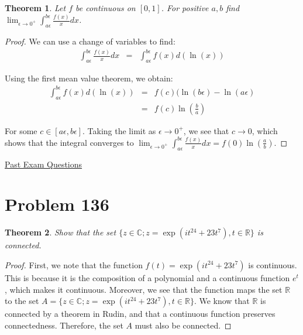 \documentclass[psamsfonts]{amsart}
\newtheorem{thm}{Theorem}[section]
\theoremstyle{definition}
\theoremstyle{remark}
\numberwithin{equation}{section}
\begin{document}
\begin{thm}
Let $f$ be continuous on $[0,1]$. For positive $a,b$ find $\lim_{\epsilon \to 0^{+}} \int_{a \epsilon}^{ b \epsilon} \frac{f(x)}{x} dx$. 
\end{thm}

\begin{proof}
We can use a change of variables to find:
\begin{eqnarray}
\int_{a \epsilon}^{b \epsilon} \frac{f(x)}{x} dx &=& \int_{a \epsilon}^{b \epsilon} f(x) d( \ln(x))
\end{eqnarray}

Using the first mean value theorem, we obtain:
\begin{eqnarray}
 \int_{a \epsilon}^{b \epsilon} f(x) d( \ln(x)) &=& f(c) ( \ln ( b \epsilon) - \ln( a \epsilon) \\
&=& f(c) \ln \left(\frac{b}{a} \right)
\end{eqnarray}

For some $c \in [a \epsilon, b \epsilon]$. Taking the limit as $\epsilon \to 0^{+}$, we see that $c \to 0$, which shows that the integral converges to $\lim_{\epsilon \to 0^{+}} \int_{a \epsilon}^{b \epsilon} \frac{f(x)}{x} dx = f(0) \ln( \frac{a}{b})$. 
\end{proof}

\huge
\begin{center}
\underline{Past Exam Questions}
\end{center}

\normalsize

\section{Problem 136}

\begin{thm}
Show that the set $\{ z \in \mathbb{C}; z = \exp(it^{24} + 23 t^7 ), t \in \mathbb{R} \}$ is connected.
\end{thm}

\begin{proof}
First, we note that the function $f(t) = \exp(it^{24} + 23 t^{7})$ is continuous. This is because it is the composition of a polynomial and a continuous function $e^t$, which makes it continuous. Moreover, we see that the function maps the set $ \mathbb{R}$ to the set $A = \{ z \in \mathbb{C}; z = \exp(it^{24} + 23 t^7 ), t \in \mathbb{R} \}$. We know that $\mathbb{R}$ is connected by a theorem in Rudin, and that a continuous function preserves connectedness. Therefore, the set $A$ must also be connected.
\end{proof}
\end{document}
